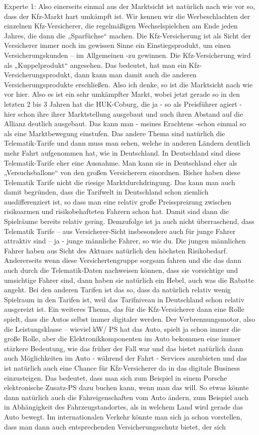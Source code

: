 Experte 1:
Also einerseits einmal aus der Marktsicht ist natürlich nach wie vor so, dass der Kfz-Markt hart umkämpft ist. Wir kennen wir die Werbeschlachten der einzelnen Kfz-Versicherer, die regelmäßigen Wechselspielchen am Ende jeden Jahres, die dann die „Sparfüchse“ machen. Die Kfz-Versicherung ist als Sicht der Versicherer immer noch im gewissen Sinne ein Einstiegsprodukt, um einen Versicherungskunden – im Allgemeinen -zu gewinnen. Die Kfz-Versicherung wird als „Kuppelprodukt“ angesehen. Das bedeutet, hat man ein Kfz-Versicherungsprodukt, dann kann man damit auch die anderen Versicherungsprodukte erschließen. Also ich denke, so ist die Marktsicht nach wie vor hier. Also es ist ein sehr umkämpfter Markt, wobei jetzt gerade so in den letzten 2 bis 3 Jahren hat die HUK-Coburg, die ja - so als Preisführer agiert - hier schon ihre ihrer Marktstellung ausgebaut und auch ihren Abstand auf die Allianz deutlich ausgebaut. Das kann man - meines Erachtens -schon einmal so als eine Marktbewegung einstufen. Das andere Thema sind natürlich die Telematik-Tarife und dann muss man sehen, welche in anderen Ländern deutlich mehr Fahrt aufgenommen hat, wie in Deutschland. In Deutschland sind diese Telematik-Tarife eher eine Ausnahme. Man kann sie in Deutschland eher als „Versuchsballone“ von den großen Versicherern einordnen. Bisher haben diese Telematik Tarife nicht die riesige Marktdurchdringung. Das kann man auch damit begründen, dass die Tarifwelt in Deutschland schon ziemlich ausdifferenziert ist, so dass man eine relativ große Preisspreizung zwischen risikoarmen und risikobehafteten Fahrern schon hat. Damit sind dann die Spielräume bereits relativ gering. Demzufolge ist ja auch nicht überraschend, dass Telematik Tarife – aus Versicherer-Sicht insbesondere auch für junge Fahrer attraktiv sind – ja - junge männliche Fahrer, so wie du. Die jungen männlichen Fahrer haben aus Sicht des Aktuars natürlich den höchsten Risikobedarf. Andererseits wenn diese Versichertengruppe sorgsam fahren und die das dann auch durch die Telematik-Daten nachweisen können, dass sie vorsichtige und umsichtige Fahrer sind, dann haben sie natürlich ein Hebel, auch was die Rabatte angeht. Bei den anderen Tarifen ist das so, dass da natürlich relativ wenig Spielraum in den Tarifen ist, weil das Tarifniveau in Deutschland schon relativ ausgereizt ist. Ein weiteres Thema, das für die Kfz-Versicherer dann eine Rolle spielt, dass die Autos selbst immer digitaler werden.  Der Verbrennungsmotor, also die Leistungsklasse – wieviel kW/ PS hat das Auto, spielt ja schon immer die große Rolle, aber die Elektronikkomponenten im Auto bekommen eine immer stärkere Bedeutung, wie das früher der Fall war und das bietet natürlich dann auch Möglichkeiten im Auto - während der Fahrt - Services anzubieten und das ist natürlich auch eine Chance für Kfz-Versicherer da in das digitale Business einzusteigen. Das bedeutet, dass man sich zum Beispiel in einem Porsche elektronische Zusatz-PS dazu buchen kann, wenn man das will. So etwas könnte dann natürlich auch die Fahreigenschaften vom Auto ändern, zum Beispiel auch in Abhängigkeit des Fahrzeugstandortes, als in welchem Land wird gerade das Auto bewegt. Im internationalen Verkehr könnte man sich ja schon vorstellen, dass man dann auch entsprechenden Versicherungsschutz bietet, der sich 